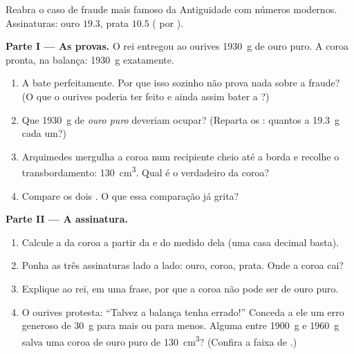 \begin{problem}\label{pb:g6:density-floating:1}
Reabra o caso de fraude mais famoso da Antiguidade com números
modernos. Assinaturas: ouro $19.3$, prata $10.5$ ( por
).

\medskip\noindent\textbf{Parte I --- As provas.}
O rei entregou ao ourives \qty{1930}{g} de ouro puro. A coroa
pronta, na balança: \qty{1930}{g} exatamente.
\begin{enumerate}
  \item A  bate perfeitamente. Por que isso sozinho não prova
        nada sobre a fraude? (O que o ourives poderia ter feito e
        ainda assim bater a ?)
  \item Que  \qty{1930}{g} de \emph{ouro puro} deveriam ocupar?
        (Reparta os : quantos  a
        \qty{19.3}{g} cada um?)
  \item Arquimedes mergulha a coroa num recipiente cheio até a borda
        e recolhe o transbordamento: \qty{130}{cm^3}. Qual é o 
        verdadeiro da coroa?
  \item Compare os dois . O que essa comparação já grita?
\end{enumerate}

\medskip\noindent\textbf{Parte II --- A assinatura.}
\begin{enumerate}[resume]
  \item Calcule a  da coroa a partir da  e do 
        medido dela (uma casa decimal basta).
  \item Ponha as três assinaturas lado a lado: ouro, coroa, prata.
        Onde a coroa cai?
  \item Explique ao rei, em uma frase, por que a coroa não pode ser
        de ouro puro.
  \item O ourives protesta: ``Talvez a balança tenha errado!''
        Conceda a ele um erro generoso de \qty{30}{g} para mais ou
        para menos. Alguma  entre \qty{1900}{g} e \qty{1960}{g}
        salva uma coroa de ouro puro de  \qty{130}{cm^3}?
        (Confira a faixa de .)
\end{enumerate}


\end{problem}
